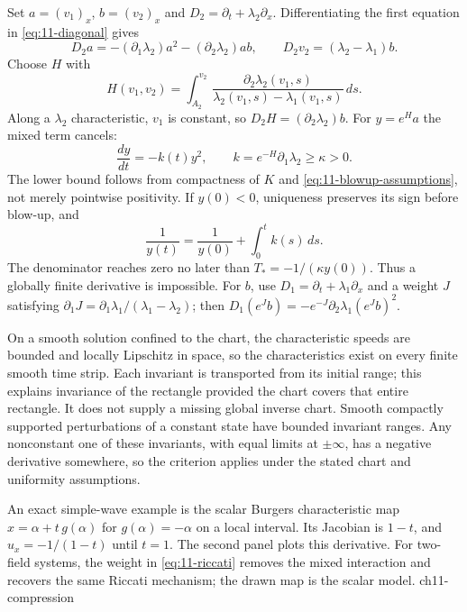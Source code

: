 \begin{expandedproof}
Set $a=(v_1)_x$, $b=(v_2)_x$ and $D_2=\partial_t+\lambda_2\partial_x$.
Differentiating the first equation in \eqref{eq:11-diagonal} gives
\[
 D_2a=-(\partial_1\lambda_2)a^2-(\partial_2\lambda_2)ab,
 \qquad D_2v_2=(\lambda_2-\lambda_1)b.
\]
Choose $H$ with
\[
 H(v_1,v_2)=\int_{A_2}^{v_2}
 \frac{\partial_2\lambda_2(v_1,s)}{\lambda_2(v_1,s)-\lambda_1(v_1,s)}\,ds.
\]
Along a $\lambda_2$ characteristic, $v_1$ is constant, so
$D_2H=(\partial_2\lambda_2)b$. For $y=e^H a$ the mixed term cancels:
\begin{equation}\label{eq:11-riccati}
 \frac{dy}{dt}=-k(t)y^2,\qquad
 k=e^{-H}\partial_1\lambda_2\ge\kappa>0.
\end{equation}
The lower bound follows from compactness of $K$ and
\eqref{eq:11-blowup-assumptions}, not merely pointwise positivity.
If $y(0)<0$, uniqueness preserves its sign before blow-up, and
\[
 \frac1{y(t)}=\frac1{y(0)}+\int_0^t k(s)\,ds.
\]
The denominator reaches zero no later than
$T_*=-1/(\kappa y(0))$. Thus a globally finite derivative is impossible.
For $b$, use $D_1=\partial_t+\lambda_1\partial_x$ and a weight
$J$ satisfying $\partial_1J=\partial_1\lambda_1/(\lambda_1-\lambda_2)$;
then $D_1(e^Jb)=-e^{-J}\partial_2\lambda_1(e^Jb)^2$.

On a smooth solution confined to the chart, the characteristic speeds
are bounded and locally Lipschitz in space, so the characteristics
exist on every finite smooth time strip. Each invariant is transported
from its initial range; this explains invariance of the rectangle
provided the chart covers that entire rectangle. It does not supply
a missing global inverse chart. Smooth compactly supported perturbations
of a constant state have bounded invariant ranges. Any nonconstant
one of these invariants, with equal limits at $\pm\infty$, has a
negative derivative somewhere, so the criterion applies under the
stated chart and uniformity assumptions.
\end{expandedproof}
{An exact simple-wave example is the scalar Burgers characteristic map
$x=\alpha+t\,g(\alpha)$ for $g(\alpha)=-\alpha$ on a local interval.
Its Jacobian is $1-t$, and $u_x=-1/(1-t)$ until $t=1$.
The second panel plots this derivative. For two-field systems, the
weight in \eqref{eq:11-riccati} removes the mixed interaction and
recovers the same Riccati mechanism; the drawn map is the scalar model.}
{ch11-compression}
